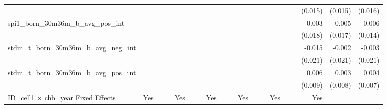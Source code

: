 \begin{tabular}{lrrrrrrrrrrrrrrrrrr}
                                            &              &              &              &              &              &              &              &              &               &              &              &               &              &              &               &      (0.015) &      (0.015) &       (0.016) \\ 
spi1\_born\_30m36m\_b\_avg\_pos\_int        &              &              &              &              &              &              &              &              &               &              &              &               &              &              &               &        0.003 &        0.005 &         0.006 \\ 
                                            &              &              &              &              &              &              &              &              &               &              &              &               &              &              &               &      (0.018) &      (0.017) &       (0.014) \\ 
stdm\_t\_born\_30m36m\_b\_avg\_neg\_int     &              &              &              &              &              &              &              &              &               &              &              &               &              &              &               &       -0.015 &       -0.002 &        -0.003 \\ 
                                            &              &              &              &              &              &              &              &              &               &              &              &               &              &              &               &      (0.021) &      (0.021) &       (0.021) \\ 
stdm\_t\_born\_30m36m\_b\_avg\_pos\_int     &              &              &              &              &              &              &              &              &               &              &              &               &              &              &               &        0.006 &        0.003 &         0.004 \\ 
                                            &              &              &              &              &              &              &              &              &               &              &              &               &              &              &               &      (0.009) &      (0.008) &       (0.007) \\ 
\midrule
ID\_cell1 $\times$ chb\_year Fixed Effects  &          Yes &              &              &          Yes &              &              &          Yes &              &               &          Yes &              &               &          Yes &              &               &          Yes &              &               \\ 

\end{tabular}
